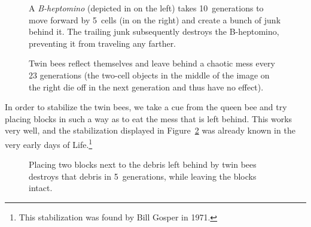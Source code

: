 \begin{figure}[!htb]
	\centering
	\begin{minipage}[b]{0.46\textwidth}
		\centering{}
		\caption{A \emph{B-heptomino} (depicted in  on the left) takes 10~generations to move forward by 5~cells (in  on the right) and create a bunch of junk behind it. The trailing junk subsequently destroys the B-heptomino, preventing it from traveling any farther.}\label{fig:b_heptomino_10}
	\end{minipage}\hfill
	\begin{minipage}[b]{0.5\textwidth}
		\centering{}
		\caption{Twin bees reflect themselves and leave behind a chaotic mess every 23 generations (the two-cell objects in the middle of the image on the right die off in the next generation and thus have no effect).}\label{fig:twin_bees}
	\end{minipage}
\end{figure}

In order to stabilize the twin bees, we take a cue from the queen bee and try placing blocks in such a way as to eat the mess that is left behind. This works very well, and the stabilization displayed in Figure~\ref{fig:twin_bees_debris_eat} was already known in the very early days of Life.\footnote{This stabilization was found by Bill Gosper in 1971.}

\begin{figure}[!htb]
	\centering
	\caption{Placing two blocks next to the debris left behind by twin bees destroys that debris in 5~generations, while leaving the blocks intact.}\label{fig:twin_bees_debris_eat}
\end{figure}


